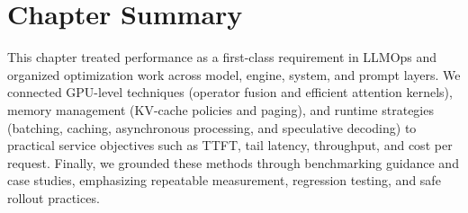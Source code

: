 \section*{Chapter Summary}
This chapter treated performance as a first-class requirement in LLMOps and organized optimization work across model, engine, system, and prompt layers. We connected GPU-level techniques (operator fusion and efficient attention kernels), memory management (KV-cache policies and paging), and runtime strategies (batching, caching, asynchronous processing, and speculative decoding) to practical service objectives such as TTFT, tail latency, throughput, and cost per request. Finally, we grounded these methods through benchmarking guidance and \ishtar{} case studies, emphasizing repeatable measurement, regression testing, and safe rollout practices.

\printbibliography[
  heading=subbibliography,
  segment=\therefsegment,
  resetnumbers=true
]

